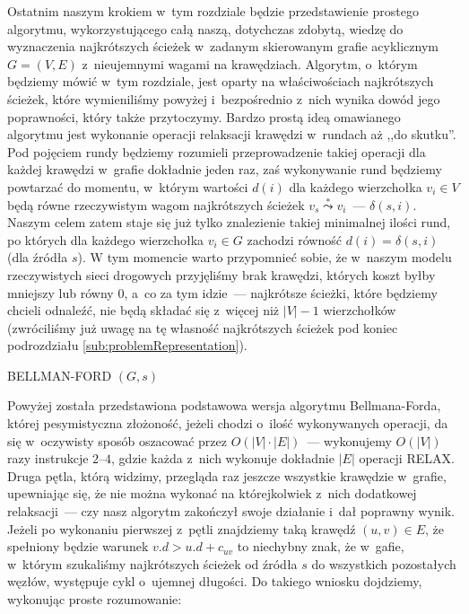 Ostatnim naszym krokiem w~tym rozdziale będzie przedstawienie prostego algorytmu, wykorzystującego całą naszą, dotychczas zdobytą, wiedzę do wyznaczenia najkrótszych ścieżek w~zadanym skierowanym grafie acyklicznym $G = \left( V, E \right)$ z~nieujemnymi wagami na krawędziach. Algorytm, o~którym będziemy mówić w~tym rozdziale, jest oparty na właściwościach najkrótszych ścieżek, które wymieniliśmy powyżej i~bezpośrednio z~nich wynika dowód jego poprawności, który także przytoczymy. Bardzo prostą ideą omawianego algorytmu jest wykonanie operacji relaksacji krawędzi w~rundach aż ,,do skutku''. Pod pojęciem rundy będziemy rozumieli przeprowadzenie takiej operacji dla każdej krawędzi w~grafie dokładnie jeden raz, zaś wykonywanie rund będziemy powtarzać do momentu, w~którym wartości $ d \left( i \right) $ dla każdego wierzchołka $v_{i} \in V$ będą równe rzeczywistym wagom najkrótszych ścieżek $v_{s} \overset{*}\leadsto v_{i}$~--- $\delta \left( s,i \right)$. Naszym celem zatem staje się już tylko znalezienie takiej minimalnej ilości rund, po których dla każdego wierzchołka $ v_{i} \in G $ zachodzi równość $ d \left( i \right) = \delta \left( s, i \right) $ (dla źródła $ s $). W tym momencie warto przypomnieć sobie, że w~naszym modelu rzeczywistych sieci drogowych przyjęliśmy brak krawędzi, których koszt byłby mniejszy lub równy $ 0 $, a~co za tym idzie~--- najkrótsze ścieżki, które będziemy chcieli odnaleźć, nie będą składać się z~więcej niż $ \left| V \right| - 1 $ wierzchołków (zwróciliśmy już uwagę na tę własność najkrótszych ścieżek pod koniec podrozdziału \ref{sub:problemRepresentation}).

\begin{algorithm}[!htbp]
\DontPrintSemicolon
{}
\caption{ BELLMAN-FORD $\left( G, s \right)$\label{alg:BellmanFord}}
\end{algorithm}

Powyżej została przedstawiona podstawowa wersja algorytmu Bellmana-Forda, której pesymistyczna złożoność, jeżeli chodzi o~ilość wykonywanych operacji, da się w~oczywisty sposób oszacować przez $ O \left( \left| V \right| \cdot \left| E \right| \right) $~---  wykonujemy $ O \left( \left| V \right| \right) $ razy instrukcje $2$--$4$, gdzie każda z~nich wykonuje dokładnie $ \left| E \right| $ operacji \textsf{RELAX}. Druga pętla, którą widzimy, przegląda raz jeszcze wszystkie krawędzie w~grafie, upewniając się, że nie można wykonać na którejkolwiek z~nich dodatkowej relaksacji~--- czy nasz algorytm zakończył swoje działanie i~dał poprawny wynik. Jeżeli po wykonaniu pierwszej z~pętli znajdziemy taką krawędź $ \left( u, v \right) \in E $, że spełniony będzie warunek $ v.d > u.d + c_{uv}$ to niechybny znak, że w~gafie, w~którym szukaliśmy najkrótszych ścieżek od źródła $s$ do wszystkich pozostałych węzłów, występuje cykl o~ujemnej długości. Do takiego wniosku dojdziemy, wykonując proste rozumowanie:

